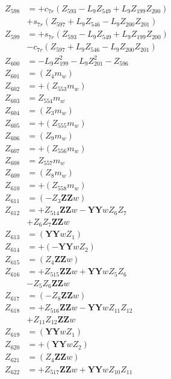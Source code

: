 \begin{multicols}{2}
\begin{align}
Z_{598} &=  + c_{7r}(Z_{593} - L_9Z_{549} + L_9Z_{199}Z_{200})  \nonumber \\
&+ s_{7r}(Z_{597} + L_9Z_{546} - L_9Z_{200}Z_{201}) \nonumber \\
Z_{599} &=  + s_{7r}(Z_{593} - L_9Z_{549} + L_9Z_{199}Z_{200})  \nonumber \\
&- c_{7r}(Z_{597} + L_9Z_{546} - L_9Z_{200}Z_{201}) \nonumber \\
Z_{600} &= - L_9Z_{199}^2 - L_9Z_{201}^2 - Z_{596}  \nonumber \\
Z_{601} &= (Z_{4}m_w) \nonumber \\
Z_{602} &= + (Z_{553}m_w) \nonumber \\
Z_{603} &=  Z_{554}m_w \nonumber \\
Z_{604} &= (Z_{3}m_w) \nonumber \\
Z_{605} &= + (Z_{555}m_w) \nonumber \\
Z_{606} &= (Z_{9}m_w) \nonumber \\
Z_{607} &=+ (Z_{556}m_w) \nonumber \\
Z_{608} &=  Z_{557}m_w \nonumber \\
Z_{609} &= (Z_{8}m_w) \nonumber \\
Z_{610} &= + (Z_{558}m_w) \nonumber \\
Z_{611} &= (-Z_{3}\mathbf{ZZ}w) \nonumber \\
Z_{612} &= + Z_{514}\mathbf{ZZ}w - \mathbf{YY}wZ_{6}Z_{7}  \nonumber \\
&+ Z_{6}Z_{7}\mathbf{ZZ}w \nonumber \\
Z_{613} &= (\mathbf{YY}wZ_{1}) \nonumber \\
Z_{614} &= + (-\mathbf{YY}wZ_{2}) \nonumber \\
Z_{615} &= (Z_{4}\mathbf{ZZ}w) \nonumber \\
Z_{616} &= + Z_{515}\mathbf{ZZ}w + \mathbf{YY}wZ_{5}Z_{6}  \nonumber \\
&- Z_{5}Z_{6}\mathbf{ZZ}w \nonumber \\
Z_{617} &= (-Z_{8}\mathbf{ZZ}w) \nonumber \\ 
Z_{618} &= + Z_{516}\mathbf{ZZ}w - \mathbf{YY}wZ_{11}Z_{12}  \nonumber \\
&+ Z_{11}Z_{12}\mathbf{ZZ}w \nonumber \\
Z_{619} &= (\mathbf{YY}wZ_{1}) \nonumber \\
Z_{620} &= + (\mathbf{YY}wZ_{2}) \nonumber \\
Z_{621} &= (Z_{4}\mathbf{ZZ}w) \nonumber \\
Z_{622} &= + Z_{517}\mathbf{ZZ}w + \mathbf{YY}wZ_{10}Z_{11}  \nonumber \\

\end{align}
\end{multicols}

